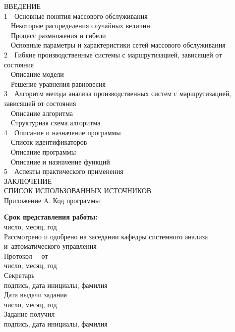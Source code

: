 \documentclass[a4paper,14pt]{extarticle}
\begin{document}
\noindent
\begin{flushleft}
ВВЕДЕНИЕ\\
1~~Основные понятия массового обслуживания\\
~~Некоторые распределения случайных величин\\
~~Процесс размножения и гибели\\
~~Основные параметры и характеристики сетей массового обслуживания\\
2~~Гибкие производственные системы с маршрутизацией, зависящей от состояния\\
~~Описание модели\\
~~Решение уравнения равновесия\\
3~~Алгоритм метода анализа производственных систем с маршрутизацией, зависящей от состояния\\
~~Описание алгоритма\\
~~Структурная схема алгоритма\\
4~~Описание и назначение программы\\
~~Список идентификаторов\\
~~Описание программы\\
~~Описание и назначение функций\\
5~~Аспекты практического применения\\
ЗАКЛЮЧЕНИЕ\\
СПИСОК ИСПОЛЬЗОВАННЫХ ИСТОЧНИКОВ\\
Приложение A. Код программы
\end{flushleft}
\begin{flushleft}
\textbf{Срок представления работы:}~\makebox[4cm]{\hrulefill}\\
\hspace{6.8cm} число, месяц, год
\medskip\\
Рассмотрено и одобрено на заседании кафедры системного анализа и~автоматического управления\\
Протокол \textnumero~\makebox[1cm]{\hrulefill}~от~\makebox[4cm]{\hrulefill}\\
\hspace{4.5cm} число, месяц, год\\
Секретарь~\makebox[4cm]{\hrulefill}~~~~~\makebox[5cm]{\hrulefill}\\
\hspace{2.7cm} подпись, дата \hspace{1.5cm} инициалы, фамилия
\medskip\\
Дата выдачи задания~\makebox[4cm]{\hrulefill}\\
\hspace{4.8cm}число, месяц, год\\
Задание получил~\makebox[4cm]{\hrulefill}~~~~~\makebox[5cm]{\hrulefill}\\
\hspace{4.2cm} подпись, дата \hspace{1.4cm} инициалы, фамилия
\end{flushleft}
\end{document}
